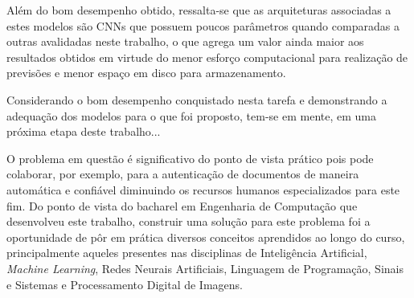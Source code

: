 Além do bom desempenho obtido, ressalta-se que as arquiteturas associadas a estes modelos são CNNs que possuem poucos parâmetros quando comparadas a outras avalidadas neste trabalho, o que agrega um valor ainda maior aos resultados obtidos em virtude do menor esforço computacional para realização de previsões e menor espaço em disco para armazenamento. 

Considerando o bom desempenho conquistado nesta tarefa e demonstrando a adequação dos modelos para o que foi proposto, tem-se em mente, em uma próxima etapa deste trabalho... 

O problema em questão é significativo do ponto de vista prático pois pode colaborar, por exemplo, para a autenticação de documentos de maneira automática e confiável diminuindo os recursos humanos especializados para este fim. Do ponto de vista do bacharel em Engenharia de Computação que desenvolveu este trabalho, construir uma solução para este problema foi a oportunidade de pôr em prática diversos conceitos aprendidos ao longo do curso, principalmente aqueles presentes nas disciplinas de Inteligência Artificial, \emph{Machine Learning}, Redes Neurais Artificiais, Linguagem de Programação, Sinais e Sistemas e Processamento Digital de Imagens.
